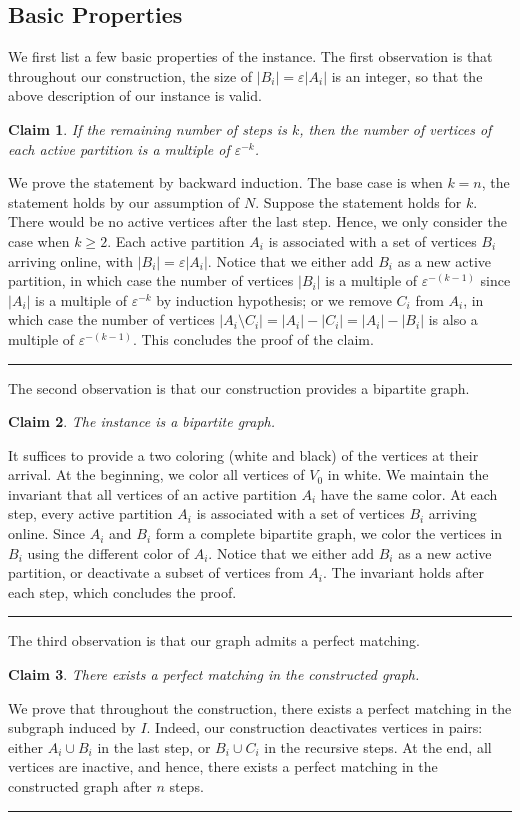 \documentclass[11pt,letterpaper]{article}
\newenvironment{proof}{{\bf Proof:  }}{\hfill\rule{2mm}{2mm}\vspace*{5pt}}
\newtheorem{claim}{Claim}[section]
\newcommand{\eps}{\varepsilon}
\begin{document}
\subsection{Basic Properties}
We first list a few basic properties of the instance.
The first observation is that throughout our construction, the size of $|B_i| = \eps|A_i|$ is an integer, so that the above description of our instance is valid.
\begin{claim}
If the remaining number of steps is $k$, then the number of vertices of each active partition is a multiple of $\eps^{-k}$.
\end{claim}
\begin{proof}
We prove the statement by backward induction. The base case is when $k=n$, the statement holds by our assumption of $N$. Suppose the statement holds for $k$. There would be no active vertices after the last step. Hence, we only consider the case when $k\ge 2$. Each active partition $A_i$ is associated with a set of vertices $B_i$ arriving online, with $|B_i|=\eps |A_i|$. Notice that we either add $B_i$ as a new active partition, in which case the number of vertices $|B_i|$ is a multiple of $\eps^{-(k-1)}$ since $|A_i|$ is a multiple of $\eps^{-k}$ by induction hypothesis; or we remove $C_i$ from $A_i$, in which case the number of vertices $|A_i \setminus C_i| = |A_i|-|C_i|=|A_i|-|B_i|$ is also a multiple of $\eps^{-(k-1)}$. This concludes the proof of the claim. 
\end{proof}

The second observation is that our construction provides a bipartite graph.
\begin{claim}
The instance is a bipartite graph.
\end{claim}
\begin{proof}
It suffices to provide a two coloring (white and black) of the vertices at their arrival. At the beginning, we color all vertices of $V_0$ in white. We maintain the invariant that all vertices of an active partition $A_i$ have the same color. At each step, every active partition $A_i$ is associated with a set of vertices $B_i$ arriving online. Since $A_i$ and $B_i$ form a complete bipartite graph, we color the vertices in $B_i$ using the different color of $A_i$. Notice that we either add $B_i$ as a new active partition, or deactivate a subset of vertices from $A_i$. The invariant holds after each step, which concludes the proof.  
\end{proof}

The third observation is that our graph admits a perfect matching.
\begin{claim}
\label{cl:perfect}
There exists a perfect matching in the constructed graph.
\end{claim}
\begin{proof}
We prove that throughout the construction, there exists a perfect matching in the subgraph induced by $I$.  Indeed, our construction deactivates vertices in pairs: either $A_i \cup B_i$ in the last step, or $B_i \cup C_i$ in the recursive steps. At the end, all vertices are inactive, and hence, there exists a perfect matching in the constructed graph after $n$ steps.
\end{proof}
\end{document}
